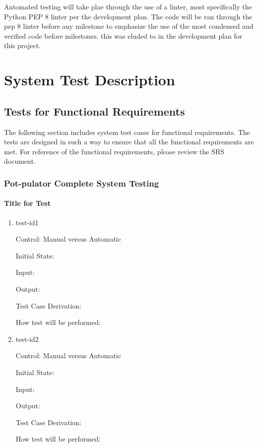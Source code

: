 \documentclass[12pt, titlepage]{article}
\begin{document}
Automated testing will take plae through the use of a linter, most specifically the Python
PEP 8 linter per the development plan. The code will be ran through the pep 8 linter before
any milestone to emphasize the use of the most condensed and verified code before milestones.
this was eluded to in the development plan for this project.


\section{System Test Description}
	
\subsection{Tests for Functional Requirements}

The following section includes system test cases for functional requirements.
The tests are designed in such a way to ensure that all the functional requirements are met.
For reference of the functional requirements, please review the SRS document.


\subsubsection{Pot-pulator Complete System Testing}

		
\paragraph{Title for Test}

\begin{enumerate}

\item{test-id1\\}

Control: Manual versus Automatic
					
Initial State: 
					
Input: 
					
Output: 

Test Case Derivation: 
					
How test will be performed: 
					
\item{test-id2\\}

Control: Manual versus Automatic
					
Initial State: 
					
Input: 
					
Output: 

Test Case Derivation: 

How test will be performed: 

\end{enumerate}
\end{document}

